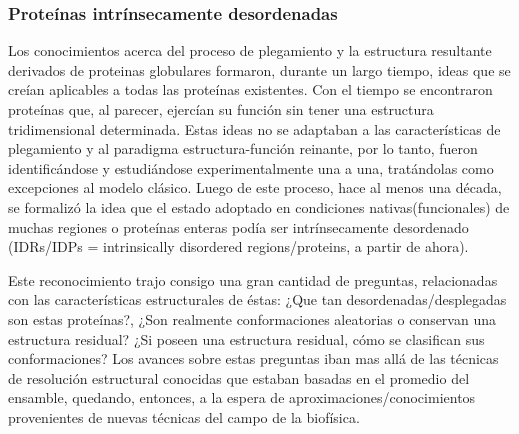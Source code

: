 \subsubsection{Proteínas intrínsecamente desordenadas}


Los conocimientos acerca del proceso de plegamiento y la estructura resultante derivados de proteinas globulares formaron, durante un largo tiempo, ideas que se creían aplicables a todas las proteínas existentes.
Con el tiempo se encontraron proteínas que, al parecer, ejercían su función sin tener una estructura tridimensional determinada. 
Estas ideas no se adaptaban a las características de plegamiento y al paradigma estructura-función reinante, por lo tanto, fueron identificándose 
y estudiándose experimentalmente una a una, tratándolas como excepciones al modelo clásico.
Luego de este proceso, hace al menos una década, se formalizó la idea que el estado adoptado en condiciones nativas(funcionales) de muchas regiones o proteínas enteras podía ser intrínsecamente desordenado
(IDRs/IDPs = intrinsically disordered regions/proteins, a partir de ahora). 



Este reconocimiento trajo consigo una gran cantidad de preguntas, relacionadas con las características estructurales de éstas:
¿Que tan desordenadas/desplegadas son estas proteínas?, ¿Son realmente conformaciones aleatorias o conservan una estructura residual?
¿Si poseen una estructura residual, cómo se clasifican sus conformaciones?
Los avances sobre estas preguntas iban mas allá de las técnicas de resolución estructural conocidas que estaban basadas en el promedio del ensamble, quedando, entonces,
a la espera de aproximaciones/conocimientos provenientes de nuevas técnicas del campo de la biofísica\cite{eliezer2009biophysical}.




